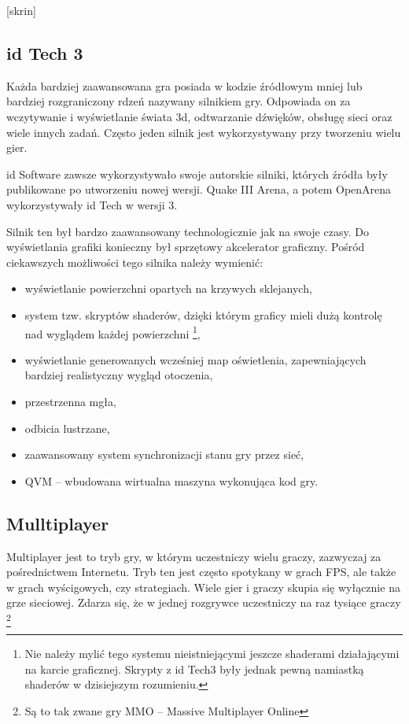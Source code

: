 [skrin]

\subsection{id Tech 3}
\label{ssec:idTech}

Każda bardziej zaawansowana gra posiada w kodzie źródłowym mniej lub bardziej
rozgraniczony rdzeń nazywany silnikiem gry. Odpowiada on za wczytywanie
i wyświetlanie świata 3d, odtwarzanie dźwięków, obsługę sieci oraz wiele
innych zadań. Często jeden silnik jest wykorzystywany przy tworzeniu wielu gier.

id Software zawsze wykorzystywało swoje autorskie silniki, których źródła były
publikowane po utworzeniu nowej wersji. Quake III Arena, a potem OpenArena
wykorzystywały id Tech w wersji 3.

Silnik ten był bardzo zaawansowany technologicznie jak na swoje czasy. Do wyświetlania
grafiki konieczny był sprzętowy akcelerator graficzny. Pośród ciekawszych
możliwości tego silnika należy wymienić:
\begin{itemize}
\item wyświetlanie powierzchni opartych na krzywych sklejanych,
\item system tzw. skryptów shaderów, dzięki którym graficy mieli dużą kontrolę
  nad wyglądem każdej powierzchni \footnote {Nie należy mylić tego systemu nieistniejącymi
    jeszcze shaderami działającymi na karcie graficznej. Skrypty z id Tech3 były jednak pewną
    namiastką shaderów w dzisiejszym rozumieniu.},
\item wyświetlanie generowanych wcześniej map oświetlenia, zapewniających bardziej
  realistyczny wygląd otoczenia,
\item przestrzenna mgła,
\item odbicia lustrzane,
\item zaawansowany system synchronizacji stanu gry przez sieć,
\item QVM -- wbudowana wirtualna maszyna wykonująca kod gry.
\end{itemize}

\subsection{Mulltiplayer}

Multiplayer jest to tryb gry, w którym uczestniczy wielu graczy, zazwyczaj za
pośrednictwem Internetu. Tryb ten jest często spotykany w grach FPS, ale także
w grach wyścigowych, czy strategiach. Wiele gier i graczy skupia się wyłącznie
na grze sieciowej. Zdarza się, że w jednej rozgrywce uczestniczy na raz
tysiące graczy \footnote {Są to tak zwane gry MMO -- Massive Multiplayer Online}

